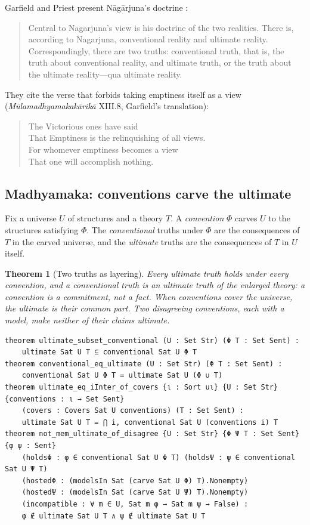 \documentclass[11pt]{article}
\theoremstyle{plain}
\newtheorem{theorem}{Theorem}[section]
\theoremstyle{definition}
\begin{document}
Garfield and Priest present Nāgārjuna's doctrine \cite{GarfieldPriest2003}:

\begin{quote}
Central to Nagarjuna's view is his doctrine of the two realities. There is, according to
Nagarjuna, conventional reality and ultimate reality. Correspondingly, there are two truths:
conventional truth, that is, the truth about conventional reality, and ultimate truth, or the
truth about the ultimate reality---qua ultimate reality.
\end{quote}

\noindent They cite the verse that forbids taking emptiness itself as a view
(\emph{Mūlamadhyamakakārikā} XIII.8, Garfield's translation):

\begin{quote}
The Victorious ones have said\\
That Emptiness is the relinquishing of all views.\\
For whomever emptiness becomes a view\\
That one will accomplish nothing.
\end{quote}

\subsection{Madhyamaka: conventions carve the ultimate}

Fix a universe $U$ of structures and a theory $T$. A \emph{convention} $\Phi$ carves $U$ to the
structures satisfying $\Phi$. The \emph{conventional} truths under $\Phi$ are the
consequences of $T$ in the carved universe, and the \emph{ultimate} truths are the consequences
of $T$ in $U$ itself.

\begin{theorem}[Two truths as layering]
Every ultimate truth holds under every convention, and a conventional truth is an ultimate
truth of the enlarged theory: a convention is a commitment, not a fact. When conventions
cover the universe, the ultimate is their common part. Two disagreeing conventions, each with
a model, make neither of their claims ultimate.
\end{theorem}

\begin{lstlisting}
theorem ultimate_subset_conventional (U : Set Str) (Φ T : Set Sent) :
    ultimate Sat U T ⊆ conventional Sat U Φ T
theorem conventional_eq_ultimate (U : Set Str) (Φ T : Set Sent) :
    conventional Sat U Φ T = ultimate Sat U (Φ ∪ T)
theorem ultimate_eq_iInter_of_covers {ι : Sort uι} {U : Set Str} {conventions : ι → Set Sent}
    (covers : Covers Sat U conventions) (T : Set Sent) :
    ultimate Sat U T = ⋂ i, conventional Sat U (conventions i) T
theorem not_mem_ultimate_of_disagree {U : Set Str} {Φ Ψ T : Set Sent} {φ ψ : Sent}
    (holdsΦ : φ ∈ conventional Sat U Φ T) (holdsΨ : ψ ∈ conventional Sat U Ψ T)
    (hostedΦ : (modelsIn Sat (carve Sat U Φ) T).Nonempty)
    (hostedΨ : (modelsIn Sat (carve Sat U Ψ) T).Nonempty)
    (incompatible : ∀ m ∈ U, Sat m φ → Sat m ψ → False) :
    φ ∉ ultimate Sat U T ∧ ψ ∉ ultimate Sat U T
\end{lstlisting}
\end{document}
